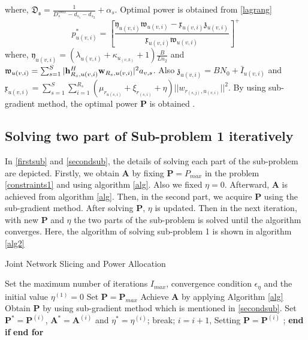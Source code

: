 \documentclass[conference]{IEEEtran}
\begin{document}
where, $\mathfrak{D_s}=\frac{1}{D_{s}^{max}-d_{s_1}-d_{s_2}}+\alpha_s$. Optimal power is obtained from  \eqref{lagrang}
\begin{equation}
p_{u(v,i)}^{*} = [\frac{\mathfrak{y}_{u(v,i)}\mathfrak{w}_{u(v,i)}-\mathfrak{x}_{u(v,i)}\mathfrak{z}_{u(v,i)}}{\mathfrak{x}_{u(v,i)}\mathfrak{w}_{u(v,i)} }]^+
\end{equation}
where, $\mathfrak{y}_{u(v,i)}= (\lambda_{u(v,i)}+\kappa_{u_{(v,k)}}+1)\frac{B}{Ln_2}$ and
$\mathfrak{w}_{u(v,i)} = \sum_{s=1}^{S}|\bold{h}_{R_s,u(v,i)}^H \bold{w}_{R_s,u(v,i)}|^2 a_{v,s}$. Also
$\mathfrak{z}_{u(v,i)} = BN_0 + \bar{I}_{u(v,i)}$ and $\mathfrak{x}_{u(v,i)} = \sum\limits_{s=1}^{S} \sum\limits_{i=1}^{R_s} ( \mu_{r_{u(s,i)}} + \xi_{r_{(s,i)}}+\eta)||w_{r_{(s,j)},u_{(v,i)}}||^2$.
By using sub-gradient method, the optimal power $\boldsymbol{P}$ is obtained \cite{mimoCran}.
\subsection{Solving two part of Sub-problem 1 iteratively}
In \eqref{firstsub} and \eqref{secondsub}, the details of solving each part of the sub-problem are depicted.
Firstly, we obtain $\boldsymbol{A}$ by fixing $\boldsymbol{P} = P_{max}$ in the problem \eqref{constraints1} and using algorithm \eqref{alg}. Also we fixed $\eta = 0$. Afterward, $\boldsymbol{A}$ is achieved from algorithm \ref{alg}. Then, in the second part, we acquire $\boldsymbol{P}$ using the sub-gradient method. After solving $\boldsymbol{P}$, $\eta$ is updated. Then in the next iteration, with new $\boldsymbol{P}$
and $\eta$ the two parts of the sub-problem is solved until the algorithm converges.
Here, the algorithm of solving sub-problem 1 is shown in algorithm \eqref{alg2}
\begin{algorithm}
\caption{Joint Network Slicing and Power Allocation}\label{alg2}
\begin{algorithmic}[1]
\State Set the maximum number of iterations $I_{max}$, convergence condition $\epsilon_{\eta}$  and the initial value $\eta^{(1)} = 0$
\State Set $\boldsymbol{P} = \boldsymbol{P}_{max}$
\State Achieve $\boldsymbol{A}$ by applying Algorithm \eqref{alg}
\State Obtain $\boldsymbol{P}$ by using sub-gradient method which is mentioned in \eqref{secondsub}.
\State Set $\boldsymbol{P}^*= \boldsymbol{P}^{(i)} $, $\boldsymbol{A}^*= \boldsymbol{A}^{(i)} $   and  $ \eta^{*} =\eta^{(i)} $;
\State break;
\Else
\State $i= i+1$, Setting $\boldsymbol{P} = \boldsymbol{P}^{(i)}$ ;
\EndIf
\State \textbf{end if}
\EndFor
\State \textbf{end for}
\end{algorithmic}
\end{algorithm}
\end{document}
